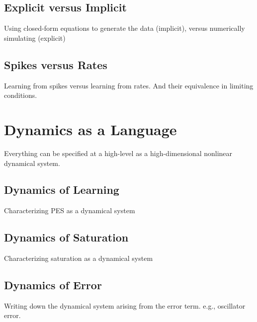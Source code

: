 \subsection{Explicit versus Implicit}

Using closed-form equations to generate the data (implicit), versus numerically simulating (explicit)

\subsection{Spikes versus Rates}

Learning from spikes versus learning from rates. And their equivalence in limiting conditions.

\section{Dynamics as a Language}

Everything can be specified at a high-level as a high-dimensional nonlinear dynamical system.

\subsection{Dynamics of Learning}

Characterizing PES as a dynamical system

\subsection{Dynamics of Saturation}

Characterizing saturation as a dynamical system

\subsection{Dynamics of Error}

Writing down the dynamical system arising from the error term. e.g., oscillator error.

